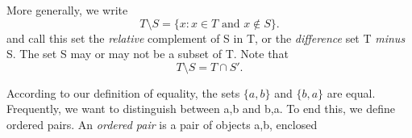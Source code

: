 \documentclass[11pt]{amsbook}
\begin{document}

More generally, we write
\[ T \setminus S = \lbrace x: x \in T \text{ and } x \notin S \rbrace .\]
and call this set the \textit{relative} complement of S in T, or the \textit{difference} set T \textit{minus} S. The set S may or may not be a subset of T. Note that
\[ T \setminus S = T \cap S'.\]


According to our definition of equality, the sets \(\lbrace a,b\rbrace\) and \(\lbrace b,a\rbrace\) are equal. Frequently, we want to distinguish between a,b and b,a. To end this, we define ordered pairs. An \textit{ordered pair} is a pair of objects a,b, enclosed
\end{document}
